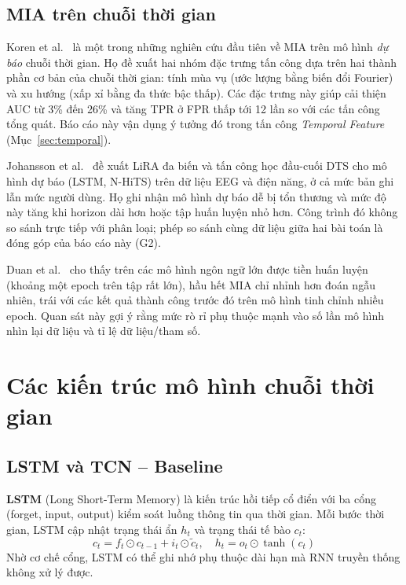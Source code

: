 \documentclass[12pt,a4paper]{report}
\begin{document}
\subsection{MIA trên chuỗi thời gian}

Koren et al.\ \cite{koren2025} là một trong những nghiên cứu đầu tiên về MIA trên mô hình \textit{dự báo} chuỗi thời gian. Họ đề xuất hai nhóm đặc trưng tấn công dựa trên hai thành phần cơ bản của chuỗi thời gian: tính mùa vụ (ước lượng bằng biến đổi Fourier) và xu hướng (xấp xỉ bằng đa thức bậc thấp). Các đặc trưng này giúp cải thiện AUC từ 3\% đến 26\% và tăng TPR ở FPR thấp tới 12 lần so với các tấn công tổng quát. Báo cáo này vận dụng ý tưởng đó trong tấn công \textit{Temporal Feature} (Mục~\ref{sec:temporal}).

Johansson et al.\ \cite{johansson2025} đề xuất LiRA đa biến và tấn công học đầu-cuối DTS cho mô hình dự báo (LSTM, N-HiTS) trên dữ liệu EEG và điện năng, ở cả mức bản ghi lẫn mức người dùng. Họ ghi nhận mô hình dự báo dễ bị tổn thương và mức độ này tăng khi horizon dài hơn hoặc tập huấn luyện nhỏ hơn. Công trình đó không so sánh trực tiếp với phân loại; phép so sánh cùng dữ liệu giữa hai bài toán là đóng góp của báo cáo này (G2).

Duan et al.\ \cite{duan2024} cho thấy trên các mô hình ngôn ngữ lớn được tiền huấn luyện (khoảng một epoch trên tập rất lớn), hầu hết MIA chỉ nhỉnh hơn đoán ngẫu nhiên, trái với các kết quả thành công trước đó trên mô hình tinh chỉnh nhiều epoch. Quan sát này gợi ý rằng mức rò rỉ phụ thuộc mạnh vào số lần mô hình nhìn lại dữ liệu và tỉ lệ dữ liệu/tham số.

\section{Các kiến trúc mô hình chuỗi thời gian}

\subsection{LSTM và TCN -- Baseline}

\textbf{LSTM} (Long Short-Term Memory) \cite{hochreiter1997} là kiến trúc hồi tiếp cổ điển với ba cổng (forget, input, output) kiểm soát luồng thông tin qua thời gian. Mỗi bước thời gian, LSTM cập nhật trạng thái ẩn $h_t$ và trạng thái tế bào $c_t$:
\[
  c_t = f_t \odot c_{t-1} + i_t \odot \tilde{c}_t, \quad h_t = o_t \odot \tanh(c_t)
\]
Nhờ cơ chế cổng, LSTM có thể ghi nhớ phụ thuộc dài hạn mà RNN truyền thống không xử lý được.
\end{document}
